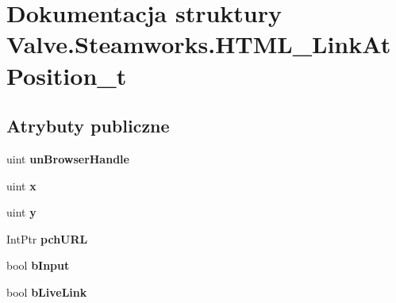 \hypertarget{struct_valve_1_1_steamworks_1_1_h_t_m_l___link_at_position__t}{}\section{Dokumentacja struktury Valve.\+Steamworks.\+H\+T\+M\+L\+\_\+\+Link\+At\+Position\+\_\+t}
\label{struct_valve_1_1_steamworks_1_1_h_t_m_l___link_at_position__t}
\subsection*{Atrybuty publiczne}
\begin{DoxyCompactItemize}
\item 
\mbox{\label{struct_valve_1_1_steamworks_1_1_h_t_m_l___link_at_position__t_ae21ce5ae6c7f0243e32277aa2e7a8103}} 
uint {\bfseries un\+Browser\+Handle}
\item 
\mbox{\label{struct_valve_1_1_steamworks_1_1_h_t_m_l___link_at_position__t_a99310745337d8e0983c579a830e85492}} 
uint {\bfseries x}
\item 
\mbox{\label{struct_valve_1_1_steamworks_1_1_h_t_m_l___link_at_position__t_a5f52d07dd7d02219e51e7987b6c1e1cc}} 
uint {\bfseries y}
\item 
\mbox{\label{struct_valve_1_1_steamworks_1_1_h_t_m_l___link_at_position__t_a12485c7036690da716ce26706c7f1e9c}} 
Int\+Ptr {\bfseries pch\+U\+RL}
\item 
\mbox{\label{struct_valve_1_1_steamworks_1_1_h_t_m_l___link_at_position__t_a4659d60caf1048b8027523b300481617}} 
bool {\bfseries b\+Input}
\item 
\mbox{\label{struct_valve_1_1_steamworks_1_1_h_t_m_l___link_at_position__t_ace15f3cd4ab6d84dfcc4c3027104314f}} 
bool {\bfseries b\+Live\+Link}
\end{DoxyCompactItemize}


